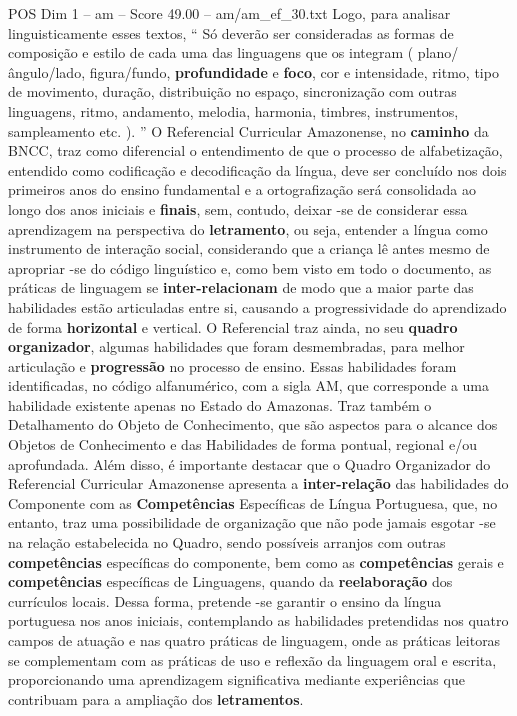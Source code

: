 \begin{textsample}{POS Dim 1 – am – Score 49.00 – am/am\_ef\_30.txt}
Logo, para analisar linguisticamente esses textos, “ Só deverão ser consideradas as formas de composição e estilo de cada uma das linguagens que os integram ( plano/ângulo/lado, figura/fundo, \textbf{profundidade} e \textbf{foco}, cor e intensidade, ritmo, tipo de movimento, duração, distribuição no espaço, sincronização com outras linguagens, ritmo, andamento, melodia, harmonia, timbres, instrumentos, sampleamento etc. ). ” O Referencial Curricular Amazonense, no \textbf{caminho} da BNCC, traz como diferencial o entendimento de que o processo de alfabetização, entendido como codificação e decodificação da língua, deve ser concluído nos dois primeiros anos do ensino fundamental e a ortografização será consolidada ao longo dos anos iniciais e \textbf{finais}, sem, contudo, deixar -se de considerar essa aprendizagem na perspectiva do \textbf{letramento}, ou seja, entender a língua como instrumento de interação social, considerando que a criança lê antes mesmo de apropriar -se do código linguístico e, como bem visto em todo o documento, as práticas de linguagem se \textbf{inter-relacionam} de modo que a maior parte das habilidades estão articuladas entre si, causando a progressividade do aprendizado de forma \textbf{horizontal} e vertical.
O Referencial traz ainda, no seu \textbf{quadro} \textbf{organizador}, algumas habilidades que foram desmembradas, para melhor articulação e \textbf{progressão} no processo de ensino.
Essas habilidades foram identificadas, no código alfanumérico, com a sigla AM, que corresponde a uma habilidade existente apenas no Estado do Amazonas.
Traz também o Detalhamento do Objeto de Conhecimento, que são aspectos para o alcance dos Objetos de Conhecimento e das Habilidades de forma pontual, regional e/ou aprofundada.
Além disso, é importante destacar que o Quadro Organizador do Referencial Curricular Amazonense apresenta a \textbf{inter-relação} das habilidades do Componente com as \textbf{Competências} Específicas de Língua Portuguesa, que, no entanto, traz uma possibilidade de organização que não pode jamais esgotar -se na relação estabelecida no Quadro, sendo possíveis arranjos com outras \textbf{competências} específicas do componente, bem como as \textbf{competências} gerais e \textbf{competências} específicas de Linguagens, quando da \textbf{reelaboração} dos currículos locais.
Dessa forma, pretende -se garantir o ensino da língua portuguesa nos anos iniciais, contemplando as habilidades pretendidas nos quatro campos de atuação e nas quatro práticas de linguagem, onde as práticas leitoras se complementam com as práticas de uso e reflexão da linguagem oral e escrita, proporcionando uma aprendizagem significativa mediante experiências que contribuam para a ampliação dos \textbf{letramentos}.


\end{textsample}
